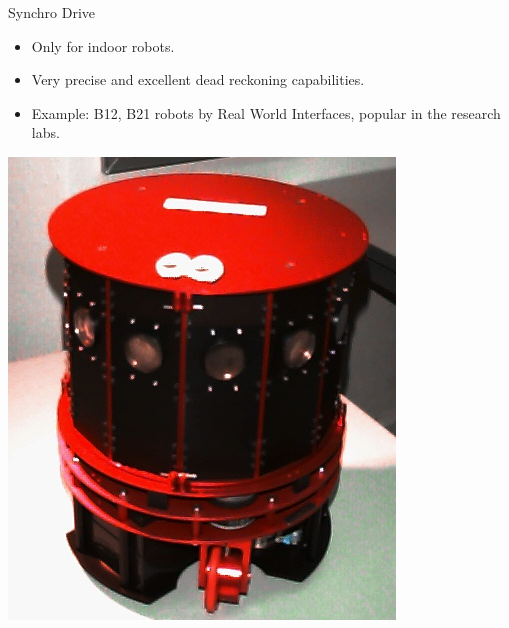 \documentclass[compress]{beamer}
\begin{document}
\begin{frame}{Synchro Drive}

\begin{itemize}
    \item Only for indoor robots.
    \item Very precise and excellent dead reckoning capabilities.
    \item Example: B12, B21 robots by Real World
  Interfaces, popular in the research labs.
\end{itemize}

    \begin{center}
        \includegraphics[height=0.4\paperheight]{synchrodrive_ex1}
        \hspace{1em}

\end{center}
\end{frame}
\end{document}
